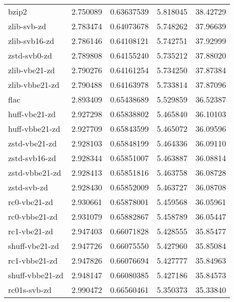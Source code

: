 \begin{table}
\begin{tabular}{|l|l|l|l|l|}
              bzip2    &2.750089  & 0.63637539 & 5.818045 & 38.42729\\
        zlib-svb-zd    &2.783474  & 0.64073678 & 5.748262 & 37.96639\\
      zlib-svb16-zd    &2.786146  & 0.64108121 & 5.742751 & 37.92999\\
    zstd-svb0-zd    &2.789808  & 0.64155240 & 5.735212 & 37.88020\\
      zlib-vbe21-zd    &2.790276  & 0.64161254 & 5.734250 & 37.87384\\
     zlib-vbbe21-zd    &2.790488  & 0.64163978 & 5.733814 & 37.87096\\
           flac    &2.893409  & 0.65438689 & 5.529859 & 36.52387\\
      huff-vbe21-zd    &2.927298  & 0.65838802 & 5.465840 & 36.10103\\
     huff-vbbe21-zd    &2.927709  & 0.65843599 & 5.465072 & 36.09596\\
      zstd-vbe21-zd    &2.928103  & 0.65848199 & 5.464336 & 36.09110\\
      zstd-svb16-zd    &2.928344  & 0.65851007 & 5.463887 & 36.08814\\
     zstd-vbbe21-zd    &2.928413  & 0.65851816 & 5.463758 & 36.08728\\
		\rowcolor{gray}
        zstd-svb-zd    &2.928430  & 0.65852009 & 5.463727 & 36.08708\\
		\rowcolor{lightgray}
       rc0-vbe21-zd    &2.930661  & 0.65878001 & 5.459568 & 36.05961\\
		\rowcolor{lightgray}
      rc0-vbbe21-zd    &2.931079  & 0.65882867 & 5.458789 & 36.05447\\
		\rowcolor{lightgray}
       rc1-vbe21-zd    &2.947403  & 0.66071828 & 5.428555 & 35.85477\\
		\rowcolor{lightgray}
     shuff-vbe21-zd    &2.947726  & 0.66075550 & 5.427960 & 35.85084\\
		\rowcolor{lightgray}
      rc1-vbbe21-zd    &2.947826  & 0.66076694 & 5.427777 & 35.84963\\
		\rowcolor{lightgray}
    shuff-vbbe21-zd    &2.948147  & 0.66080385 & 5.427186 & 35.84573\\
	       \hline
		\rowcolor{lightgray}
       rc01s-svb-zd    &2.990472  & 0.66560461 & 5.350373 & 35.33840\\

\end{tabular}
\end{table}
